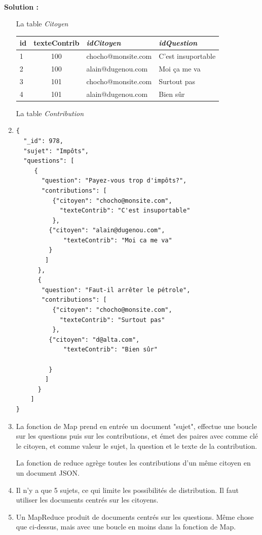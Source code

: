 \documentclass[11pt,a4paper]{article}
\newenvironment{solution}[0]{
~\\ \color{red} \textbf{Solution : }\color{black}}{%
}
\newcommand{\cle}[1]{\textbf{#1}}
\def\fk#1{\textit{#1}}
\def\tble#1{\textit{#1}}
\begin{document}
\begin{solution}
\begin{enumerate}
\begin{center}
\centerline{La table \tble{Citoyen}}

\begin{tabular}{l|c|l|l}
\cle{id} & texteContrib & \fk{idCitoyen} & \fk{idQuestion} \\
\hline
1 & 100 &  chocho@monsite.com& C'est insuportable\\
2  & 100  & alain@dugenou.com & Moi ça me va\\
3 & 101  &  chocho@monsite.com& Surtout pas\\
4 & 101  & alain@dugenou.com & Bien sûr\\
\hline
\end{tabular}

La table \tble{Contribution}
\end{center}
   \item


\begin{verbatim}
{
  "_id": 978,
  "sujet": "Impôts",
  "questions": [
     {
       "question": "Payez-vous trop d'impôts?",
       "contributions": [
          {"citoyen": "chocho@monsite.com",
            "texteContrib": "C'est insuportable"
          },
         {"citoyen": "alain@dugenou.com",
             "texteContrib": "Moi ca me va"
         }
        ]
      },
      {
       "question": "Faut-il arrêter le pétrole",
       "contributions": [
          {"citoyen": "chocho@monsite.com",
            "texteContrib": "Surtout pas"
          },
         {"citoyen": "d@alta.com",
             "texteContrib": "Bien sûr"
             
         }
        ]
      }
    ]
}
\end{verbatim}        
    
    \item La fonction de Map prend en entrée un document "sujet", effectue une boucle sur les questions
        puis sur les contributions, et émet des paires avec comme clé le citoyen, et comme valeur le sujet, la question
           et le texte de la contribution.
           
           La fonction de reduce agrège toutes les contributions d'un même citoyen en un document JSON.
           
     \item Il n'y a que 5 sujets, ce qui limite les possibilités de distribution. Il faut utiliser les documents 
            centrés sur les citoyens.
        
      \item Un MapReduce produit de documents centrés sur les questions. Même chose que ci-dessus, mais
          avec une boucle en moins dans la fonction de Map.
\end{enumerate}
\end{solution}
\end{document}

